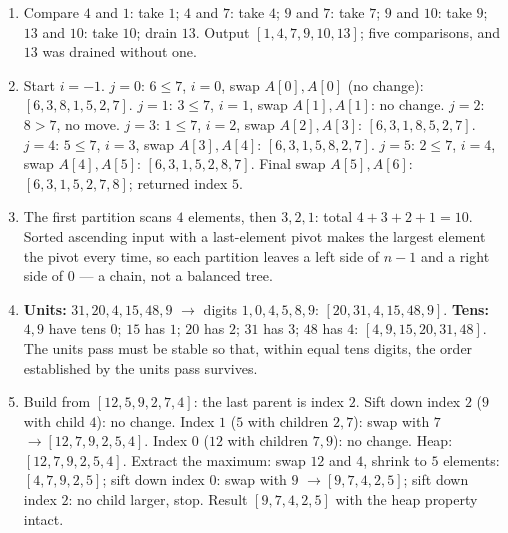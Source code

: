\documentclass[11pt]{article}
\begin{document}
\begingroup\small
\begin{enumerate}
  \item Compare $4$ and $1$: take $1$; $4$ and $7$: take $4$; $9$ and $7$: take $7$; $9$ and $10$: take $9$; $13$ and $10$: take $10$; drain $13$. Output $[1,4,7,9,10,13]$; five comparisons, and $13$ was drained without one.
  \item Start $i=-1$. $j=0$: $6\le7$, $i=0$, swap $A[0],A[0]$ (no change): $[6,3,8,1,5,2,7]$. $j=1$: $3\le7$, $i=1$, swap $A[1],A[1]$: no change. $j=2$: $8>7$, no move. $j=3$: $1\le7$, $i=2$, swap $A[2],A[3]$: $[6,3,1,8,5,2,7]$. $j=4$: $5\le7$, $i=3$, swap $A[3],A[4]$: $[6,3,1,5,8,2,7]$. $j=5$: $2\le7$, $i=4$, swap $A[4],A[5]$: $[6,3,1,5,2,8,7]$. Final swap $A[5],A[6]$: $[6,3,1,5,2,7,8]$; returned index $5$.
  \item The first partition scans $4$ elements, then $3,2,1$: total $4+3+2+1=10$. Sorted ascending input with a last-element pivot makes the largest element the pivot every time, so each partition leaves a left side of $n-1$ and a right side of $0$ --- a chain, not a balanced tree.
  \item \textbf{Units:} $31,20,4,15,48,9$ $\to$ digits $1,0,4,5,8,9$: $[20,31,4,15,48,9]$. \textbf{Tens:} $4,9$ have tens $0$; $15$ has $1$; $20$ has $2$; $31$ has $3$; $48$ has $4$: $[4,9,15,20,31,48]$. The units pass must be stable so that, within equal tens digits, the order established by the units pass survives.
  \item Build from $[12,5,9,2,7,4]$: the last parent is index $2$. Sift down index $2$ ($9$ with child $4$): no change. Index $1$ ($5$ with children $2,7$): swap with $7$ $\to[12,7,9,2,5,4]$. Index $0$ ($12$ with children $7,9$): no change. Heap: $[12,7,9,2,5,4]$. Extract the maximum: swap $12$ and $4$, shrink to $5$ elements: $[4,7,9,2,5]$; sift down index $0$: swap with $9$ $\to[9,7,4,2,5]$; sift down index $2$: no child larger, stop. Result $[9,7,4,2,5]$ with the heap property intact.
\end{enumerate}
\endgroup



\end{document}
